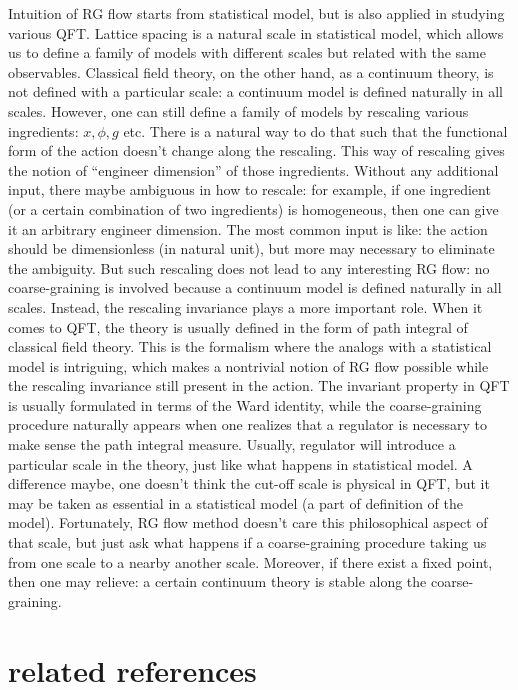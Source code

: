 Intuition of RG flow starts from statistical model, 
but is also applied in studying various QFT. 
Lattice spacing is a natural scale in statistical model, 
which allows us to define a family of models with different scales but related with the same observables. 
Classical field theory, on the other hand, as a continuum theory, is not defined with a particular scale: 
a continuum model is defined naturally in all scales. 
However, one can still define a family of models by rescaling various ingredients: $x,\phi,g$ etc. 
There is a natural way to do that such that the functional form of the action doesn't change along the rescaling. 
This way of rescaling gives the notion of ``engineer dimension'' of those ingredients. 
Without any additional input, there maybe ambiguous in how to rescale: 
for example, if one ingredient (or a certain combination of two ingredients) is homogeneous, 
then one can give it an arbitrary engineer dimension. 
The most common input is like: the action should be dimensionless (in natural unit), 
but more may necessary to eliminate the ambiguity. 
But such rescaling does not lead to any interesting RG flow: 
no coarse-graining is involved because a continuum model is defined naturally in all scales. 
Instead, the rescaling invariance plays a more important role. 
When it comes to QFT, the theory is usually defined in the form of path integral of classical field theory. 
This is the formalism where the analogs with a statistical model is intriguing, 
which makes a nontrivial notion of RG flow possible while the rescaling invariance still present in the action. 
The invariant property in QFT is usually formulated in terms of the Ward identity, 
while the coarse-graining procedure naturally appears when one realizes that a regulator is necessary to make sense the path integral measure. 
Usually, regulator will introduce a particular scale in the theory, just like what happens in statistical model. 
A difference maybe, one doesn't think the cut-off scale is physical in QFT, but it may be taken as essential in a statistical model (a part of definition of the model). 
Fortunately, RG flow method doesn't care this philosophical aspect of that scale, but just ask what happens if a coarse-graining procedure taking us from one scale to a nearby another scale. 
Moreover, if there exist a fixed point, then one may relieve: a certain continuum theory is stable along the coarse-graining.

\section{related references}

